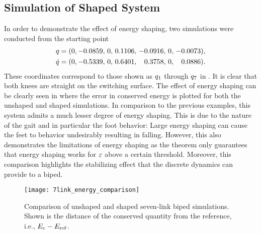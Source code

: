 \subsection{Simulation of Shaped System}


In order to demonstrate the effect of energy shaping, two simulations were conducted
from the starting point
\begin{align*}
  q &= (0, -0.0859, \, 0, \, 0.1106, \, -0.0916, \, 0, \, -0.0073),\\
  \dot{q} &= (0, -0.5339, \, 0, \, 0.6401, \, \hphantom{-}0.3758, \, 0, \, \hphantom{-}0.0886).
\end{align*}
%
These coordinates correspond to those shown as $q_{1}$ through $q_{7}$ in
.
%
It is clear that both knees are straight on the switching surface.
%
The effect of energy shaping can be clearly seen in
 where the error in conserved energy is
plotted for both the unshaped and shaped simulations.
%
In comparison to the previous examples, this system admits a much lesser degree
of energy shaping.
%
This is due to the nature of the gait and in particular the foot behavior:
%
Large energy shaping can cause the feet to behavior undesirably resulting in
falling.
%
However, this also demonstrates the limitations of energy shaping as the theorem
only guarantees that energy shaping works for $\varepsilon$ above a certain
threshold.
%
Moreover, this comparison highlights the stabilizing effect that the discrete
dynamics can provide to a biped.

\begin{figure}[t!]
  \centering
  \texttt{[image: 7link\_energy\_comparison]}
  \caption[Comparison of shaped and unshaped seven-link biped
  simulations.]{Comparison of unshaped and shaped seven-link biped
    simulations.
    Shown is the distance of the conserved quantity from the reference, i.e.,
    $E_{c} - E_{\mathrm{ref}}$.}
  \label{fig:7link_energy_comparison}
\end{figure}
